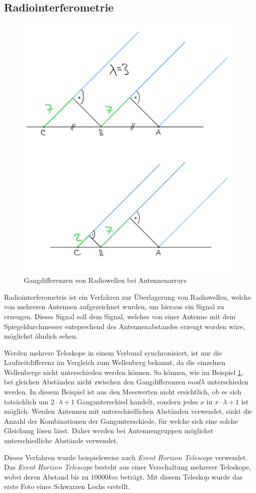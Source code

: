 \documentclass[]{dsadokumentation}
\begin{document}
\subsection{Radiointerferometrie}
\begin{figure}
\includegraphics[width=.4\textwidth]{k4.2/baselineunterschied.png}
\caption{Gangdifferenzen von Radiowellen bei Antennenarrays}
\label{bildBaselineunterschied}
\end{figure}

Radiointerferometrie ist ein Verfahren zur Überlagerung von Radiowellen, welche von mehreren Antennen aufgezeichnet wurden, um hieraus ein Signal zu erzeugen. Dieses Signal soll dem Signal, welches von einer Antenne mit dem Spiegeldurchmesser entsprechend des Antennenabstandes erzeugt worden wäre, möglichst ähnlich sehen.

Werden mehrere Teleskope in einem Verbund synchronisiert, ist nur die Laufzeitdifferenz im Vergleich zum Wellenberg bekannt, da die einzelnen Wellenberge nicht unterschieden werden können. So können, wie im Beispiel  \ref{bildBaselineunterschied}, bei gleichen Abständen nicht zwischen den Gangdifferenzen $mod \lambda$ unterschieden werden. In diesem Beispiel ist aus den Messwerten nicht ersichtlich, ob es sich tatsächlich um $2\cdot \lambda +1$ Gangunterschied handelt, sondern jedes $x$ in $x\cdot\lambda+1$ ist möglich. Werden Antennen mit unterschiedlichen Abständen verwendet, sinkt die Anzahl der Kombinationen der Gangunterschiede, für welche sich eine solche Gleichung lösen lässt. Daher werden bei Antennengruppen möglichst unterschiedliche Abstände verwendet.

Dieses Verfahren wurde beispielsweise auch \emph{Event Horizon Telescope} verwendet. Das \emph{Event Horizon Telescope} besteht aus einer Verschaltung mehrerer Teleskope, wobei deren Abstand bis zu $10000km$ beträgt. Mit diesem Teleskop wurde das erste Foto eines Schwarzen Lochs erstellt.
\end{document}
